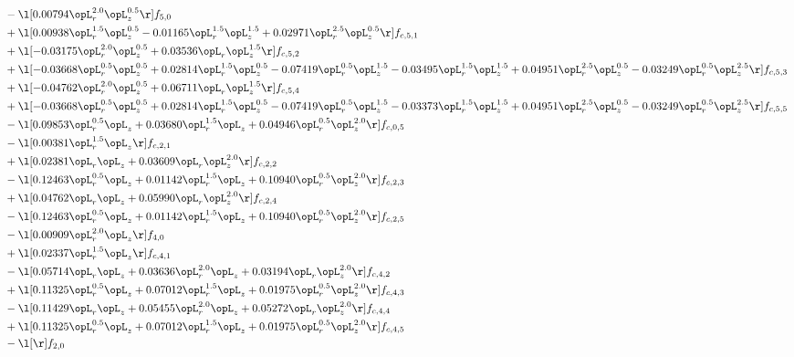 \begin{alignat}{2}
& - \l[  0.00794 \opL_r^{2.0} \opL_z^{0.5}  \r] f_{5,0} \nonumber \\ 
& + \l[  0.00938 \opL_r^{1.5} \opL_z^{0.5}   -0.01165 \opL_r^{1.5} \opL_z^{1.5} +  0.02971 \opL_r^{2.5} \opL_z^{0.5}  \r] f_{c,5,1} \nonumber \\ 
& + \l[  -0.03175 \opL_r^{2.0} \opL_z^{0.5} +  0.03536 \opL_r \opL_z^{1.5}  \r] f_{c,5,2} \nonumber \\ 
& + \l[  -0.03668 \opL_r^{0.5} \opL_z^{0.5} +  0.02814 \opL_r^{1.5} \opL_z^{0.5}   -0.07419 \opL_r^{0.5} \opL_z^{1.5}   -0.03495 \opL_r^{1.5} \opL_z^{1.5} +  0.04951 \opL_r^{2.5} \opL_z^{0.5}   -0.03249 \opL_r^{0.5} \opL_z^{2.5}  \r] f_{c,5,3} \nonumber \\ 
& + \l[  -0.04762 \opL_r^{2.0} \opL_z^{0.5} +  0.06711 \opL_r \opL_z^{1.5}  \r] f_{c,5,4} \nonumber \\ 
& + \l[  -0.03668 \opL_r^{0.5} \opL_z^{0.5} +  0.02814 \opL_r^{1.5} \opL_z^{0.5}   -0.07419 \opL_r^{0.5} \opL_z^{1.5}   -0.03373 \opL_r^{1.5} \opL_z^{1.5} +  0.04951 \opL_r^{2.5} \opL_z^{0.5}   -0.03249 \opL_r^{0.5} \opL_z^{2.5}  \r] f_{c,5,5} \nonumber \\ 
& - \l[  0.09853 \opL_r^{0.5} \opL_z +  0.03680 \opL_r^{1.5} \opL_z +  0.04946 \opL_r^{0.5} \opL_z^{2.0}  \r] f_{c,0,5} \nonumber \\ 
& - \l[  0.00381 \opL_r^{1.5} \opL_z  \r] f_{c,2,1} \nonumber \\ 
& + \l[  0.02381 \opL_r \opL_z +  0.03609 \opL_r \opL_z^{2.0}  \r] f_{c,2,2} \nonumber \\ 
& - \l[  0.12463 \opL_r^{0.5} \opL_z +  0.01142 \opL_r^{1.5} \opL_z +  0.10940 \opL_r^{0.5} \opL_z^{2.0}  \r] f_{c,2,3} \nonumber \\ 
& + \l[  0.04762 \opL_r \opL_z +  0.05990 \opL_r \opL_z^{2.0}  \r] f_{c,2,4} \nonumber \\ 
& - \l[  0.12463 \opL_r^{0.5} \opL_z +  0.01142 \opL_r^{1.5} \opL_z +  0.10940 \opL_r^{0.5} \opL_z^{2.0}  \r] f_{c,2,5} \nonumber \\ 
& - \l[  0.00909 \opL_r^{2.0} \opL_z  \r] f_{4,0} \nonumber \\ 
& + \l[  0.02337 \opL_r^{1.5} \opL_z  \r] f_{c,4,1} \nonumber \\ 
& - \l[  0.05714 \opL_r \opL_z +  0.03636 \opL_r^{2.0} \opL_z +  0.03194 \opL_r \opL_z^{2.0}  \r] f_{c,4,2} \nonumber \\ 
& + \l[  0.11325 \opL_r^{0.5} \opL_z +  0.07012 \opL_r^{1.5} \opL_z +  0.01975 \opL_r^{0.5} \opL_z^{2.0}  \r] f_{c,4,3} \nonumber \\ 
& - \l[  0.11429 \opL_r \opL_z +  0.05455 \opL_r^{2.0} \opL_z +  0.05272 \opL_r \opL_z^{2.0}  \r] f_{c,4,4} \nonumber \\ 
& + \l[  0.11325 \opL_r^{0.5} \opL_z +  0.07012 \opL_r^{1.5} \opL_z +  0.01975 \opL_r^{0.5} \opL_z^{2.0}  \r] f_{c,4,5} \nonumber \\ 
& - \l[  \r] f_{2,0} \nonumber \\ 
\end{alignat} 


